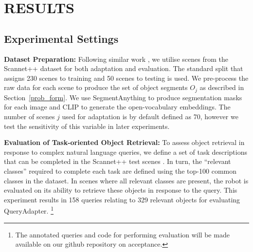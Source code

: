\section{RESULTS}
\subsection{Experimental Settings}


\textbf{Dataset Preparation:} Following similar work \cite{bare, ovoslam}, we utilise scenes from the Scannet++ dataset \cite{scannet++} for both adaptation and evaluation. The standard split that assigns 230 scenes to training and 50 scenes to testing is used. We pre-process the raw data for each scene to produce the set of object segments $O_{j}$ as described in Section~\ref{prob_form}. We use SegmentAnything \cite{segment_anything} to produce segmentation masks for each image and CLIP \cite{clip} to generate the open-vocabulary embeddings. The number of scenes $j$ used for adaptation is by default defined as 70, however we test the sensitivity of this variable in later experiments.


\textbf{Evaluation of Task-oriented Object Retrieval:}
To assess object retrieval in response to complex natural language queries, we define a set of task descriptions that can be completed in the Scannet++ test scenes \cite{scannet++}. In turn, the ``relevant classes'' required to complete each task are defined using the top-100 common classes in the dataset. In scenes where all relevant classes are present, the robot is evaluated on its ability to retrieve these objects in response to the query. This experiment results in 158 queries relating to 329 relevant objects for evaluating QueryAdapter. \footnote{The annotated queries and code for performing evaluation will be made available on our github repository on acceptance.\label{myfootnote}}

